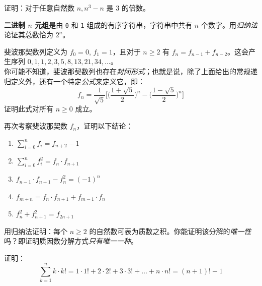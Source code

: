 \begin{exercise}
    证明：对于任意自然数 $n, n^3 - n$ 是 $3$ 的倍数。
\end{exercise}

\begin{exercise}
    \textbf{二进制 $n$ 元组}是由 \verb|0| 和 \verb|1| 组成的有序字符串，字符串中共有 $n$ 个数字。用\emph{归纳法}论证其总数恰为 $2^n$。
\end{exercise}

\begin{exercise}
    斐波那契数列定义为 $f_0 = 0$, $f_1 = 1$，且对于 $n \ge 2$ 有 $f_n = f_{n-1} + f_{n-2}$。这会产生序列 $0, 1, 1, 2, 3, 5, 8, 13, 21, 34, \dots$。\\
    你可能不知道，斐波那契数列也存在\emph{封闭形式}；也就是说，除了上面给出的常规递归定义外，还有一个特定\emph{公式}来定义它，即：
    \[f_n = \frac{1}{\sqrt 5}\Bigg[\Bigg(\frac{1+\sqrt 5}{2}\Bigg)^n - \Bigg(\frac{1-\sqrt 5}{2}\Bigg)^n\Bigg]\]
    证明此式对所有 $n \ge 0$ 成立。
\end{exercise}

\begin{exercise}
    再次考察斐波那契数 $f_n$，证明以下结论：
    \begin{enumerate}
        \item $\displaystyle{\sum_{i=0}^{n}f_i = f_{n+2} - 1}$
        \item $\displaystyle{\sum_{i=0}^{n}f_i^2 = f_n \cdot f_{n+1}}$
        \item $\displaystyle{f_{n-1} \cdot f_{n+1} - f_n^2 = (-1)^n}$
        \item $\displaystyle{f_{m+n} = f_n \cdot f_{n+1} + f_{m-1} \cdot f_n}$
        \item $\displaystyle{f_n^2 + f_{n+1}^2 = f_{2n+1}}$
    \end{enumerate}
\end{exercise}

\begin{exercise}
    用归纳法证明：每个 $n \ge 2$ 的自然数可表为质数之积。你能证明该分解的\emph{唯一性}吗？即证明质因数分解方式\emph{只有唯一一种}。
\end{exercise}

\begin{exercise}
    证明：
    \[\sum_{k=1}^{n} k \cdot k! = 1 \cdot 1! + 2 \cdot 2! + 3 \cdot 3! + \dots + n \cdot n! = (n+1)!-1\]
\end{exercise}

